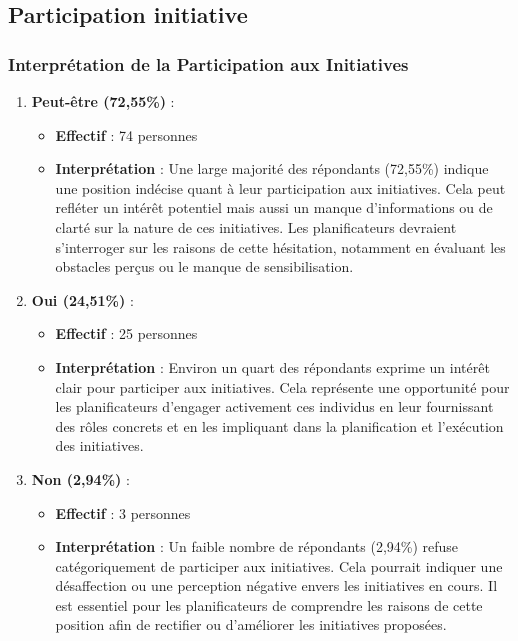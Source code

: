 \documentclass[
]{article}
\providecommand{\tightlist}{%
  \setlength{\itemsep}{0pt}\setlength{\parskip}{0pt}}
\begin{document}
\subsection{Participation initiative}\label{participation-initiative}

\subsubsection{Interprétation de la Participation aux
Initiatives}\label{interpruxe9tation-de-la-participation-aux-initiatives}

\begin{enumerate}
\def\labelenumi{\arabic{enumi}.}
\tightlist
\item
  \textbf{Peut-être (72,55\%)} :

  \begin{itemize}
  \tightlist
  \item
    \textbf{Effectif} : 74 personnes
  \item
    \textbf{Interprétation} : Une large majorité des répondants
    (72,55\%) indique une position indécise quant à leur participation
    aux initiatives. Cela peut refléter un intérêt potentiel mais aussi
    un manque d'informations ou de clarté sur la nature de ces
    initiatives. Les planificateurs devraient s'interroger sur les
    raisons de cette hésitation, notamment en évaluant les obstacles
    perçus ou le manque de sensibilisation.
  \end{itemize}
\item
  \textbf{Oui (24,51\%)} :

  \begin{itemize}
  \tightlist
  \item
    \textbf{Effectif} : 25 personnes
  \item
    \textbf{Interprétation} : Environ un quart des répondants exprime un
    intérêt clair pour participer aux initiatives. Cela représente une
    opportunité pour les planificateurs d'engager activement ces
    individus en leur fournissant des rôles concrets et en les
    impliquant dans la planification et l'exécution des initiatives.
  \end{itemize}
\item
  \textbf{Non (2,94\%)} :

  \begin{itemize}
  \tightlist
  \item
    \textbf{Effectif} : 3 personnes
  \item
    \textbf{Interprétation} : Un faible nombre de répondants (2,94\%)
    refuse catégoriquement de participer aux initiatives. Cela pourrait
    indiquer une désaffection ou une perception négative envers les
    initiatives en cours. Il est essentiel pour les planificateurs de
    comprendre les raisons de cette position afin de rectifier ou
    d'améliorer les initiatives proposées.
  \end{itemize}
\end{enumerate}
\end{document}

